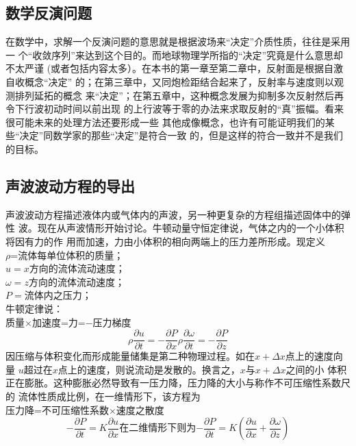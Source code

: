 \subsection{数学反演问题}
在数学中，求解一个反演问题的意思就是根据波场来“决定”介质性质，往往是采用一
个“收敛序列”来达到这个目的。而地球物理学所指的“决定”究竟是什么意思却不太严谨
(或者包括内容太多）。在本书的第一章至第二章中，反射面是根据自激自收概念“决定”
的；在第三章中，又同炮检距结合起来了，反射率与速度则以观测排列延拓的概念
来“决定”；在第五章中，这种概念发展为抑制多次反射然后再令下行波初动时间以前出现
的上行波等于零的办法来求取反射的“真”振幅。看来很可能未来的处理方法还要形成一些
其他成像概念，也许有可能证明我们的某些“决定”同数学家的那些“决定”是符合一致
的，但是这样的符合一致并不是我们的目标。

\subsection{声波波动方程的导出}
声波波动方程描述液体内或气体内的声波，另一种更复杂的方程组描述固体中的弹性
波。现在从声波情形开始讨论。牛顿动量守恒定律说，气体之内的一个小体积将因有力的作
用而加速，力由小体积的相向两端上的压力差所形成。现定义\\
$\rho$=流体每单位体积的质量；\\
$u=x$方向的流体流动速度；\\
$\omega=z$方向的流体流动速度；\\
$P=$流体内之压力；\\
牛顿定律说：\\
质量$\times$加速度=力=$-$压力梯度\\
\begin{subequations}\label{eq:ex1.4.3}
\begin{equation}
\rho\frac{\partial u}{\partial t}=-\frac{\partial P}{\partial x} \label{eq:ex1.4.3a}
\end{equation}
\begin{equation}
\rho\frac{\partial\omega}{\partial t}=-\frac{\partial P}{\partial z} \label{eq:ex1.4.3b}
\end{equation}
\end{subequations}
因压缩与体积变化而形成能量储集是第二种物理过程。如在$x+\Delta x$点上的速度向量
$u$超过在$x$点上的速度，则说流动是发散的。换言之，$x$与$x+\Delta x$之间的小
体积正在膨胀。这种膨胀必然导致有一压力降，压力降的大小与称作不可压缩性系数尺的
流体性质成比例，在一维情形下，该方程为\\
压力降=不可压缩性系数$\times$速度之散度\\
\begin{subequations}\label{eq:ex1.4.4}
\begin{equation}
-\frac{\partial P}{\partial t}=K\frac{\partial u}{\partial x} \label{eq:ex1.4.4a}
\end{equation}
在二维情形下则为
\begin{equation}
-\frac{\partial P}{\partial t}=K(\frac{\partial u}{\partial x}+\frac{\partial \omega}{\partial z}) \label{eq:ex1.4.4b}
\end{equation}
\end{subequations}
